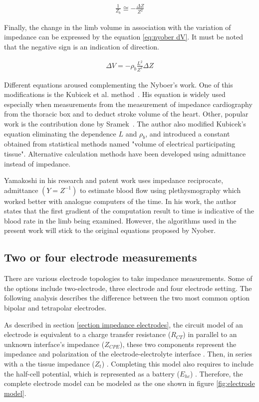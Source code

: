 \begin{align}
	\label{eq:parallel model2}
	\frac{1}{Z_b}\cong -\frac{\Delta Z}{Z^2}
\end{align}

Finally, the change in the limb volume in association with the variation of impedance can be expressed by the equation \ref{eq:nyober dV}. It must be noted that the negative sign is an indication of direction.

\begin{align}
	\label{eq:nyober dV}
	\Delta V = -\rho_b \frac{L^2}{Z^2}\Delta Z
\end{align}

Different equations aroused complementing the Nyboer's work. One of this modifications is the Kubicek et al. method~\cite{karnegis1966development, kubicek1970impedance, kubicek1979impedance}. His equation is widely used especially when measurements from the measurement of impedance cardiography from the thoracic box and to deduct stroke volume of the heart. Other, popular work is the contribution done by Sramek~\cite{sramek1986bomed}. The author also modified Kubicek's equation eliminating the dependence $L$ and $\rho_b$,  and introduced a constant obtained from statistical methods named "volume of electrical participating tissue". Alternative calculation methods have been developed using admittance instead of impedance.

Yamakoshi \cite{shimazu1982evaluation,yamakoshi1980limb,yamakoshi1978admittance} in his research and patent work uses impedance reciprocate, admittance $(Y=Z^{-1})$ to estimate blood flow using plethysmography which worked better with analogue computers of the time. In his work, the author states that the first gradient of the computation result to time is indicative of the blood rate in the limb being examined. However, the algorithms used in the present work will stick to the original equations proposed by Nyober.

\subsection{Two or four electrode measurements}
\label{section iPG electrodes}
There are various electrode topologies to take impedance measurements. Some of the options include two-electrode, three electrode and four electrode setting. The following analysis describes the difference between the two most common option bipolar and tetrapolar electrodes.

As described in section \ref{section impedance electrodes}, the circuit model of an electrode is equivalent to a charge transfer resistance ($R_{CT}$) in parallel to an unknown interface's impedance ($Z_{CPE}$), these two components represent the impedance and polarization of the electrode-electrolyte interface \cite{neuman2000biomedical}. Then, in series with a the tissue impedance ($Z_t$) \cite{lvovich2012impedance}. Completing this model also requires to include the half-cell potential, which is represented as a battery ($E_{hc}$) \cite{neuman2000biomedical}. Therefore, the complete electrode model can be modeled as the one shown in figure \ref{fig:electrode model}.

